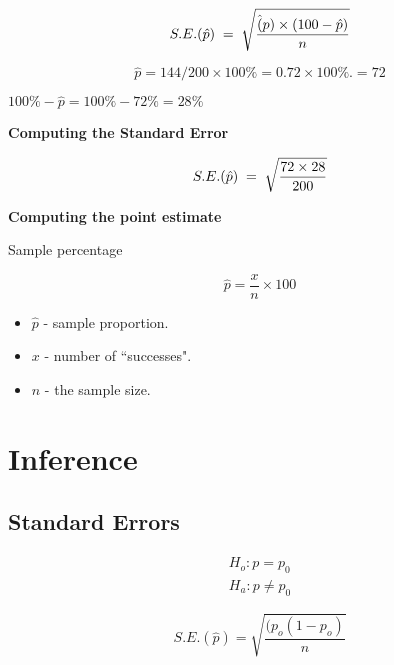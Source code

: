 \documentclass[]{report}
\begin{document}
{{{\[
S.E. (\hat{p}) \;=\; \sqrt{ {\hat(p) \times (100 -\hat{p} )\over n}}
\]



\[
\hat{p} = {144/200}  \times 100\%  = 0.72 \times 100\%.  = 72%
\]

$100\% - \hat{p} = 100\% - 72\% = 28\% $

}


{
\textbf{Computing the Standard Error}

\[
S.E. (\hat{p}) \;=\; \sqrt{ {72 \times 28 \over 200 }}
\]


}



{
\textbf{Computing the point estimate}

Sample percentage

\[
\hat{p} = \frac{x}{n} \times 100%
\]

\begin{itemize}
\item $\hat{p}$ - sample proportion.
\item $x$  - number of ``successes".
\item $n$  - the sample size.
\end{itemize}

}








\section{Inference}

\subsection{Standard Errors}

\begin{eqnarray*}
H_{o}: p = p_{0} \\
H_{a}: p \neq p_{0}
\end{eqnarray*}

\begin{equation}
S.E.(\hat{p})=\sqrt{\frac{(p_{o}(1-p_{o})}{n}}
\end{equation}


}}
\end{document}
